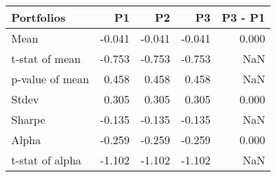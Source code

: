 \begin{tabular}{lrrrr}
\toprule
Portfolios & P1 & P2 & P3 & P3 - P1 \\
\midrule
Mean & -0.041 & -0.041 & -0.041 & 0.000 \\
t-stat of mean & -0.753 & -0.753 & -0.753 & NaN \\
p-value of mean & 0.458 & 0.458 & 0.458 & NaN \\
Stdev & 0.305 & 0.305 & 0.305 & 0.000 \\
Sharpe & -0.135 & -0.135 & -0.135 & NaN \\
Alpha & -0.259 & -0.259 & -0.259 & 0.000 \\
t-stat of alpha & -1.102 & -1.102 & -1.102 & NaN \\
\bottomrule
\end{tabular}
